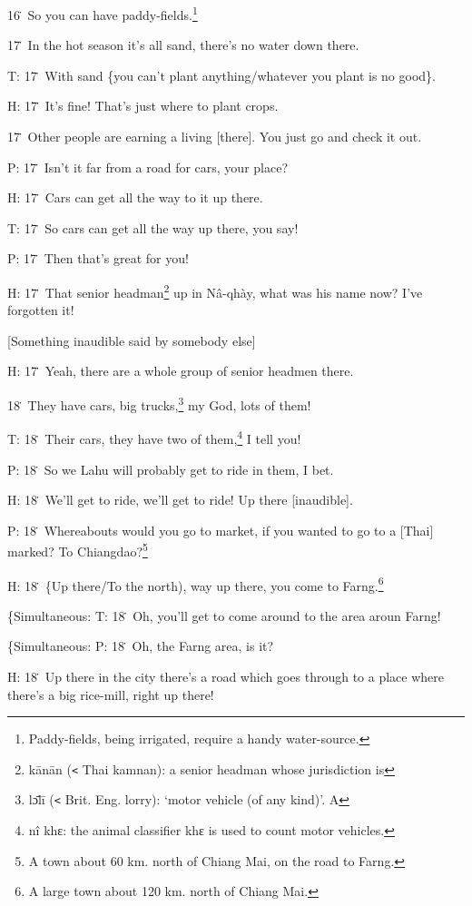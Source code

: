 16\. So you can have paddy-fields.\footnote{Paddy-fields, being irrigated, require a handy water-source.}

17\. In the hot season it's all sand, there's no water down there.

T: 17\. With sand \{you can't plant anything/whatever you plant is no good\}.

H: 17\. It's fine! That's just where to plant crops.

17\. Other people are earning a living [there]. You just go and check it out.

P: 17\. Isn't it far from a road for cars, your place?

H: 17\. Cars can get all the way to it up there.

T: 17\. So cars can get all the way up there, you say!

P: 17\. Then that's great for you!

H: 17\. That senior headman\footnote{kānān (\texttt{<} Thai kamnan): a senior headman whose jurisdiction is} up in Nâ-qhày, what was his name now? I've forgotten
it!

[Something inaudible said by somebody else]

H: 17\. Yeah, there are a whole group of senior headmen there.

18\. They have cars, big trucks,\footnote{lɔ̄lī (\texttt{<} Brit. Eng. lorry): `motor vehicle (of any kind)'. A} my God, lots of them!

T: 18\. Their cars, they have two of them,\footnote{nî khɛ: the animal classifier khɛ is used to count motor vehicles.} I tell you!

P: 18\. So we Lahu will probably get to ride in them, I bet.

H: 18\. We'll get to ride, we'll get to ride! Up there [inaudible].

P: 18\. Whereabouts would you go to market, if you wanted to go to a [Thai] marked?
To Chiangdao?\footnote{A town about 60 km. north of Chiang Mai, on the road to Farng.}

H: 18\. \{Up there/To the north), way up there, you come to Farng.\footnote{A large town about 120 km. north of Chiang Mai.}

\{Simultaneous: T: 18\. Oh, you'll get to come around to the area aroun Farng!

\{Simultaneous: P: 18\. Oh, the Farng area, is it?

H: 18\. Up there in the city there's a road which goes through to a place where
there's a big rice-mill, right up there!

